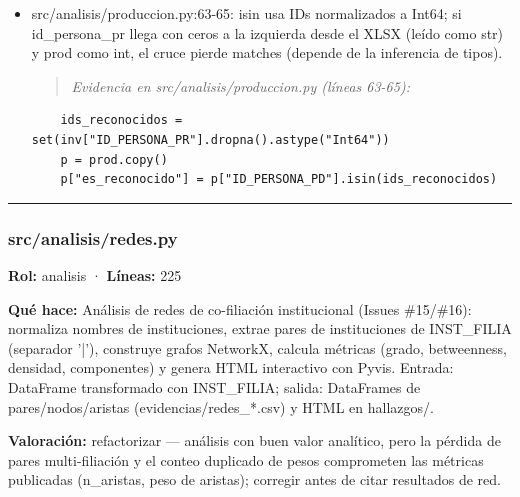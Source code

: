 \begin{itemize}
  \item src/analisis/produccion.py:63-65: isin usa IDs normalizados a Int64; si id\_persona\_pr llega con ceros a la izquierda desde el XLSX (leído como str) y prod como int, el cruce pierde matches (depende de la inferencia de tipos).
\begin{quote}\footnotesize\ttfamily
\noindent\emph{Evidencia en src/analisis/produccion.py (líneas 63-65):}
\end{quote}
\begin{lstlisting}
    ids_reconocidos = set(inv["ID_PERSONA_PR"].dropna().astype("Int64"))
    p = prod.copy()
    p["es_reconocido"] = p["ID_PERSONA_PD"].isin(ids_reconocidos)
\end{lstlisting}

\end{itemize}

\medskip
\hrule

\subsubsection{src/analisis/redes.py}
\textbf{Rol:} analisis · \textbf{Líneas:} 225

\textbf{Qué hace:} Análisis de redes de co-filiación institucional (Issues \#15/\#16): normaliza nombres de instituciones, extrae pares de instituciones de INST\_FILIA (separador '|'), construye grafos NetworkX, calcula métricas (grado, betweenness, densidad, componentes) y genera HTML interactivo con Pyvis. Entrada: DataFrame transformado con INST\_FILIA; salida: DataFrames de pares/nodos/aristas (evidencias/redes\_*.csv) y HTML en hallazgos/.

\textbf{Valoración:} refactorizar --- análisis con buen valor analítico, pero la pérdida de pares multi-filiación y el conteo duplicado de pesos comprometen las métricas publicadas (n\_aristas, peso de aristas); corregir antes de citar resultados de red.

